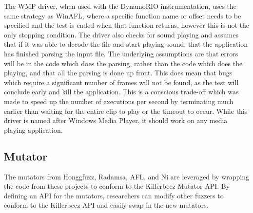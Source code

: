 The WMP driver, when used with the DynamoRIO instrumentation, uses the same strategy as WinAFL, where a specific function
name or offset needs to be specified and the test is ended when that function returns, however
this is not the only stopping condition. The driver also checks for sound
playing and assumes that if it was able to decode the file and start playing
sound, that the application has finished parsing the input file.
The underlying assumptions are that errors will be in the
code which does the parsing, rather than the code which does the playing, and that all
the parsing is done up front.  This does mean that bugs which require a
significant number of frames will not be found, as the test will conclude
early and kill the application.  This is a conscious trade-off which was made
to speed up the number of executions per second by terminating much earlier than
waiting for the entire clip to
play or the timeout to occur.  While this driver is named after Windows Media Player,
it should work on any media playing application. 

\subsection{Mutator} \label{Mutator}
The mutators from Honggfuzz, Radamsa, AFL, and Ni are leveraged by wrapping the
code from these projects to conform to the Killerbeez Mutator API. By
defining an API for the mutators, researchers can modify other
fuzzers to conform to the Killerbeez API and easily swap in the new mutators.

